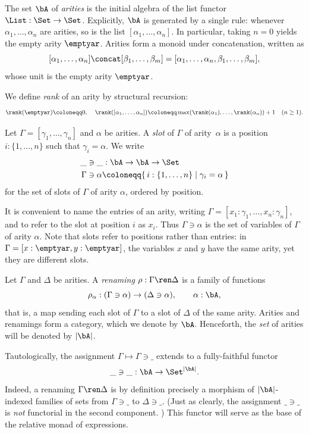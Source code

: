 \begin{definition}
    The set $\bA$ of \emph{arities} is the initial algebra of the list functor $\List : \Set \to \Set$. Explicitly, $\bA$ is generated by a single rule: whenever $\alpha_1, \ldots, \alpha_n$ are arities, so is the list $[\alpha_1, \ldots, \alpha_n]$. In particular, taking $n = 0$ yields the empty arity $\emptyar$. Arities form a monoid under concatenation, written as
    \[
    [\alpha_1, \ldots, \alpha_n] \concat [\beta_1, \ldots, \beta_m] = [\alpha_1, \ldots, \alpha_n, \beta_1, \ldots, \beta_m],
    \]
    whose unit is the empty arity $\emptyar$.

    We define \emph{rank} of an arity by structural recursion:
    \[
    \rank(\emptyar) \coloneqq 0,\;\;\;\; \rank([\alpha_1, \ldots, \alpha_n]) \coloneqq \max(\rank(\alpha_1), \ldots, \rank(\alpha_n)) + 1 \quad (n \geq 1).
    \]

    Let $\Gamma = [\gamma_1, \ldots, \gamma_n]$ and $\alpha$ be arities. A \emph{slot} of $\Gamma$ of arity~$\alpha$ is a position $i : \{1, \ldots, n\}$ such that $\gamma_i = \alpha$. We write
    \begin{align*}
        \_ &\ni \_ : \bA \to \bA \to \Set\\
        \Gamma &\ni \alpha \coloneqq \{\, i : \{1, \ldots, n\} \mid \gamma_i = \alpha \,\}
    \end{align*}
    for the set of slots of $\Gamma$ of arity $\alpha$, ordered by position.

    It is convenient to name the entries of an arity, writing $\Gamma = [x_1 : \gamma_1, \ldots, x_n : \gamma_n]$, and to refer to the slot at position $i$ as $x_i$. Thus $\Gamma \ni \alpha$ is the set of variables of $\Gamma$ of arity $\alpha$. Note that slots refer to positions rather than entries: in $\Gamma = [x : \emptyar, y : \emptyar]$, the variables $x$ and $y$ have the same arity, yet they are different slots.

    Let $\Gamma$ and $\Delta$ be arities. A \emph{renaming} $\rho : \Gamma \ren \Delta$ is a family of functions
    \[
    \rho_\alpha : (\Gamma \ni \alpha) \to (\Delta \ni \alpha), \qquad \alpha : \bA,
    \]
    that is, a map sending each slot of $\Gamma$ to a slot of $\Delta$ of the same arity. Arities and renamings form a category, which we denote by $\bA$. Henceforth, the \emph{set} of arities will be denoted by $\left|\bA\right|$.

    Tautologically, the assignment $\Gamma \mapsto \Gamma \ni \_$ extends to a fully-faithful functor
    \[
    \_ \ni \_ : \bA \to \Set^{\left|\bA\right|}.
    \]
    Indeed, a renaming $\Gamma \ren \Delta$ is by definition precisely a morphism of $\left|\bA\right|$-indexed families of sets from $\Gamma \ni \_$ to $\Delta \ni \_$. (Just as clearly, the assignment $\_ \ni \_$ is \emph{not} functorial in the second component.
    ) This functor will serve as the base of the relative monad of expressions.
\end{definition}

